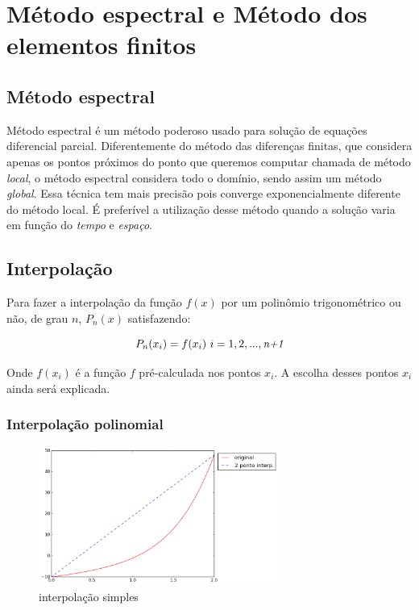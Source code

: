\chapter{Método espectral e Método dos elementos finitos}
\label{cap:I}
\section{Método espectral} 

 Método espectral é um método poderoso usado para solução de equações diferencial parcial. Diferentemente do método das diferenças finitas, que considera apenas os pontos próximos do ponto que queremos computar chamada de método \emph{local}, o método espectral considera todo o domínio, sendo assim um método \emph{global}. Essa técnica tem mais precisão pois converge exponencialmente diferente do método local. É preferível a utilização desse método quando a solução varia em função do \textit{tempo} e \textit{espaço}. 

\section{Interpolação}
 Para fazer a interpolação da função $f(x)$ por um polinômio trigonométrico ou não, de grau $n$, $P_{n}(x)$ satisfazendo:

\begin{equation}
	P_n (x_i) = f(x_i) \ i = 1,2,...,\emph{n+1}
\end{equation}

 Onde $f(x_i)$ é a função $f$ pré-calculada nos pontos $x_i$. A escolha desses pontos $x_i$ ainda será explicada.

\subsection{Interpolação polinomial}
 \begin{figure}[!ht]
  \includegraphics[width=0.7\textwidth,center]{figuras/interpolacao_linear.png}
  \caption{interpolação simples}
\end{figure}

